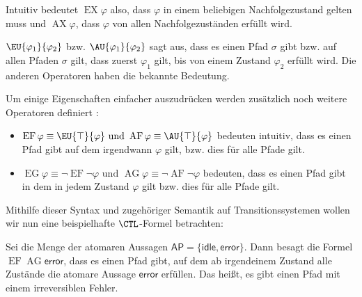 Intuitiv bedeutet $\operatorname{EX}\varphi$ also, dass $\varphi$ in einem beliebigen Nachfolgezustand gelten muss und $\operatorname{AX}\varphi$, dass $\varphi$ von allen Nachfolgezuständen erfüllt wird.

$\EU{\varphi_1}{\varphi_2}$ bzw. $\AU{\varphi_1}{\varphi_2}$ sagt aus, dass es einen Pfad $\sigma$ gibt bzw. auf allen Pfaden $\sigma$ gilt, dass zuerst $\varphi_1$ gilt, bis von einem Zustand $\varphi_2$ erfüllt wird.
Die anderen Operatoren haben die bekannte Bedeutung.

Um einige Eigenschaften einfacher auszudrücken werden zusätzlich noch weitere Operatoren definiert \cite{clarke1982design}:
\begin{itemize}
	\item $\operatorname{EF}\varphi \equiv \EU{\top}{\varphi}\text{ und }\operatorname{AF}\varphi \equiv \AU{\top}{\varphi}$ bedeuten intuitiv, dass es einen Pfad gibt  auf dem irgendwann $\varphi$ gilt, bzw. dies für alle Pfade gilt.
	\item $\operatorname{EG}\varphi \equiv \neg\operatorname{EF}\neg\varphi\text{ und }\operatorname{AG}\varphi \equiv \neg\operatorname{AF}\neg\varphi$ bedeuten, dass es einen Pfad gibt in dem in jedem Zustand $\varphi$ gilt bzw. dies für alle Pfade gilt.
\end{itemize}
Mithilfe dieser Syntax und zugehöriger Semantik auf Transitionssystemen wollen wir nun eine beispielhafte $\CTL$-Formel betrachten:
\begin{example}
	Sei die Menge der atomaren Aussagen $\mathsf{AP}=\{\mathsf{idle}, \mathsf{error}\}$.
	Dann besagt die Formel $\operatorname{EF}\operatorname{AG}\mathsf{error}$, dass es einen Pfad gibt, auf dem ab irgendeinem Zustand alle Zustände die atomare Aussage $\mathsf{error}$ erfüllen. 
	Das heißt, es gibt einen Pfad mit einem irreversiblen Fehler.
\end{example}
